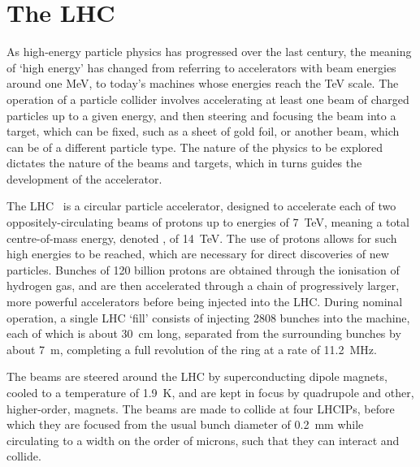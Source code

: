 \chapter{The \acl{LHC}}
\label{chap:intro:lhc}

As high-energy particle physics has progressed over the last century, the 
meaning of `high energy' has changed from referring to accelerators with beam 
energies around one \si{\MeV}, to today's machines whose energies reach the 
\si{\TeV} scale.
The operation of a particle collider involves accelerating at least one beam of 
charged particles up to a given energy, and then steering and focusing the beam 
into a target, which can be fixed, such as a sheet of gold foil, or another 
beam, which can be of a different particle type.
The nature of the physics to be explored dictates the nature of the beams and 
targets, which in turns guides the development of the accelerator.

The \acl{LHC}~\cite{Bruning:2004ej} is a circular particle accelerator, 
designed to accelerate each of two oppositely-circulating beams of protons up 
to energies of \SI{7}{\TeV}, meaning a total centre-of-mass energy, denoted 
\sqrts, of \SI{14}{\TeV}.
The use of protons allows for such high energies to be reached, which are 
necessary for direct discoveries of new particles.
Bunches of 120 billion protons are obtained through the ionisation of hydrogen 
gas, and are then accelerated through a chain of progressively larger, more 
powerful accelerators before being injected into the \ac{LHC}.
During nominal operation, a single \ac{LHC} `fill' consists of injecting 2808 
bunches into the machine, each of which is about \SI{30}{\centi\metre} long, 
separated from the surrounding bunches by about \SI{7}{\metre}, completing a 
full revolution of the ring at a rate of \SI{11.2}{\mega\hertz}.

The beams are steered around the \ac{LHC} by superconducting dipole magnets, 
cooled to a temperature of \SI{1.9}{\kelvin}, and are kept in focus by 
quadrupole and other, higher-order, magnets.
The beams are made to collide at four \acp{LHCIP}, before which they are 
focused from the usual bunch diameter of \SI{0.2}{\milli\metre} while 
circulating to a width on the order of microns, such that they can interact and 
collide.

